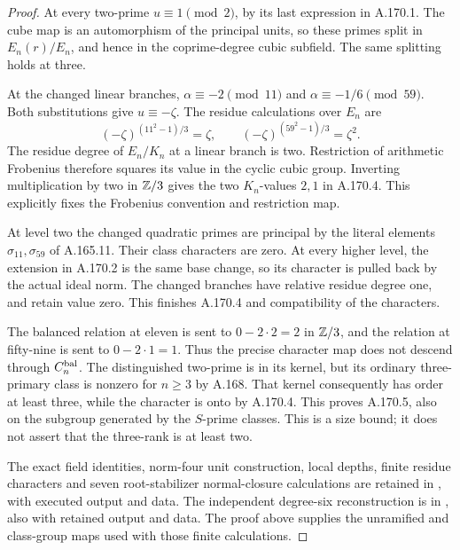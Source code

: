 \begin{proof}
At every two-prime \(u\equiv1\pmod2\), by its last expression in
A.170.1.  The cube map is an automorphism of the principal units,
so these primes split in \(E_n(r)/E_n\), and hence in the
coprime-degree cubic subfield.  The same splitting holds at three.

At the changed linear branches, \(\alpha\equiv-2\pmod{11}\)
and \(\alpha\equiv-1/6\pmod{59}\).  Both substitutions give
\(u\equiv-\zeta\).  The residue calculations over \(E_n\) are
\[
 (-\zeta)^{(11^2-1)/3}=\zeta,\qquad
 (-\zeta)^{(59^2-1)/3}=\zeta^2 .
\tag{A.170.16}
\]
The residue degree of \(E_n/K_n\) at a linear branch is two.
Restriction of arithmetic Frobenius therefore squares its value
in the cyclic cubic group.  Inverting multiplication by two
in \(\mathbb Z/3\) gives the two \(K_n\)-values \(2,1\) in A.170.4.
This explicitly fixes the Frobenius convention and restriction map.

At level two the changed quadratic primes are principal by the
literal elements \(\sigma_{11},\sigma_{59}\) of A.165.11.
Their class characters are zero.  At every higher level, the
extension in A.170.2 is the same base change, so its character is
pulled back by the actual ideal norm.  The changed branches have
relative residue degree one, and retain value zero.
This finishes A.170.4 and compatibility of the characters.

The balanced relation at eleven is sent to
\(0-2\cdot2=2\) in \(\mathbb Z/3\), and the relation at fifty-nine
is sent to \(0-2\cdot1=1\).  Thus the precise character map does
not descend through \(C_n^{\rm bal}\).
The distinguished two-prime is in its kernel, but its ordinary
three-primary class is nonzero for \(n\ge3\) by A.168.
That kernel consequently has order at least three, while the
character is onto by A.170.4.  This proves A.170.5, also on the
subgroup generated by the \(S\)-prime classes.  This is a size
bound; it does not assert that the three-rank is at least two.

The exact field identities, norm-four unit construction, local
depths, finite residue characters and seven root-stabilizer
normal-closure calculations are retained in
, with executed
output and data.  The independent degree-six reconstruction is in
, also with retained
output and data.  The proof above supplies the unramified and
class-group maps used with those finite calculations.
\end{proof}
